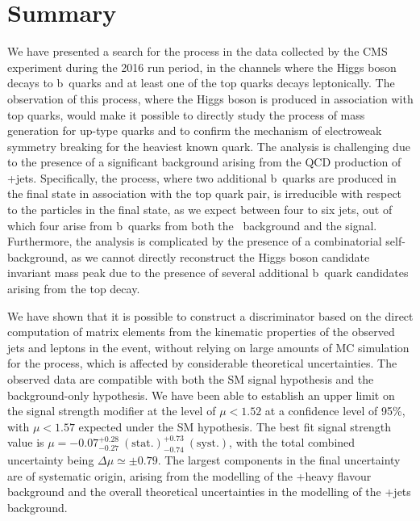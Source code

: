 \section{Summary}
\label{sec:tth_summary}
We have presented a search for the \ttH\xspace process in the data collected by the CMS experiment during the 2016 run period, in the channels where the Higgs boson decays to b~quarks and at least one of the top quarks decays leptonically. The observation of this process, where the Higgs boson is produced in association with top quarks, would make it possible to directly study the process of mass generation for up-type quarks and to confirm the mechanism of electroweak symmetry breaking for the heaviest known quark. The analysis is challenging due to the presence of a significant background arising from the QCD production of \ttbar+jets. Specifically, the \ttbb\xspace process, where two additional b~quarks are produced in the final state in association with the top quark pair, is irreducible with respect to the particles in the final state, as we expect between four to six jets, out of which four arise from b~quarks from both the \ttbb~background and the \ttHbb\xspace signal. Furthermore, the analysis is complicated by the presence of a combinatorial self-background, as we cannot directly reconstruct the Higgs boson candidate invariant mass peak due to the presence of several additional b~quark candidates arising from the top decay.

We have shown that it is possible to construct a discriminator based on the direct computation of matrix elements from the kinematic properties of the observed jets and leptons in the event, without relying on large amounts of MC simulation for the \ttbb\xspace process, which is affected by considerable theoretical uncertainties. The observed data are compatible with both the SM signal hypothesis and the background-only hypothesis. We have been able to establish an upper limit on the signal strength modifier at the level of $\mu < 1.52$ at a confidence level of 95\%, with $\mu < 1.57$ expected under the SM hypothesis. The best fit signal strength value is $\mu = -0.07  ^{+0.28}_{-0.27}~\mathrm{(stat.)} ^{+0.73}_{-0.74}~\mathrm{(syst.)}$, with the total combined uncertainty being $\Delta\mu \simeq \pm 0.79$. The largest components in the final uncertainty are of systematic origin, arising from the modelling of the \ttbar+heavy flavour background and the overall theoretical uncertainties in the modelling of the \ttbar+jets background.

